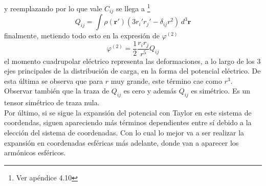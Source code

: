 y reemplazando por lo que vale $C_{ij}$ se llega a \footnote{Ver apéndice 4.10}
\begin{equation}
    Q_{ij} = 
    \int \rho(\textbf{r}') (3r_{i}'r_{j}' - \delta_{ij}r^{2})\,d^{3}\textbf{r}
        \label{ec:TérminoCuadrupolar}
\end{equation}
finalmente, metiendo todo esto en la expresión de $\varphi^{(2)}$
\begin{equation*}
    \varphi^{(2)} = \frac{1}{2}
    \frac{r_{i}r_{j}}{r^{5}}Q_{ij}
\end{equation*}
el momento cuadrupolar eléctrico representa las deformaciones, a lo largo de los 3 ejes principales de la distribución de carga, en la forma del potencial eléctrico. De esta última se observa que para $r$ muy grande, este término cae como $r^{3}$.\\
\indent Observar también que la traza de $Q_{ij}$ es cero y además $Q_{ij}$ es simétrico. Es un tensor simétrico de traza nula.\\
\indent Por último, si se sigue la expansión del potencial con Taylor en este sistema de coordendas, siguen apareciendo más términos dependientes entre sí debido a la elección del sistema de coordenadas. Con lo cual lo mejor va a ser realizar la expansión en coordenadas esféricas más adelante, donde van a aparecer los armónicos esféricos.




